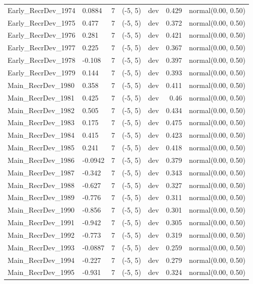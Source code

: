 \documentclass[
]{scrartcl}
\begin{document}
\begin{longtable}{llrllrl}
Early\_RecrDev\_1974 & 0.0884 & 7 & (-5, 5) & dev & 0.429 & normal(0.00, 0.50) \\ 
Early\_RecrDev\_1975 & 0.477 & 7 & (-5, 5) & dev & 0.372 & normal(0.00, 0.50) \\ 
Early\_RecrDev\_1976 & 0.281 & 7 & (-5, 5) & dev & 0.421 & normal(0.00, 0.50) \\ 
Early\_RecrDev\_1977 & 0.225 & 7 & (-5, 5) & dev & 0.367 & normal(0.00, 0.50) \\ 
Early\_RecrDev\_1978 & -0.108 & 7 & (-5, 5) & dev & 0.397 & normal(0.00, 0.50) \\ 
Early\_RecrDev\_1979 & 0.144 & 7 & (-5, 5) & dev & 0.393 & normal(0.00, 0.50) \\ 
Main\_RecrDev\_1980 & 0.358 & 7 & (-5, 5) & dev & 0.411 & normal(0.00, 0.50) \\ 
Main\_RecrDev\_1981 & 0.425 & 7 & (-5, 5) & dev & 0.46 & normal(0.00, 0.50) \\ 
Main\_RecrDev\_1982 & 0.505 & 7 & (-5, 5) & dev & 0.434 & normal(0.00, 0.50) \\ 
Main\_RecrDev\_1983 & 0.175 & 7 & (-5, 5) & dev & 0.475 & normal(0.00, 0.50) \\ 
Main\_RecrDev\_1984 & 0.415 & 7 & (-5, 5) & dev & 0.423 & normal(0.00, 0.50) \\ 
Main\_RecrDev\_1985 & 0.241 & 7 & (-5, 5) & dev & 0.418 & normal(0.00, 0.50) \\ 
Main\_RecrDev\_1986 & -0.0942 & 7 & (-5, 5) & dev & 0.379 & normal(0.00, 0.50) \\ 
Main\_RecrDev\_1987 & -0.342 & 7 & (-5, 5) & dev & 0.343 & normal(0.00, 0.50) \\ 
Main\_RecrDev\_1988 & -0.627 & 7 & (-5, 5) & dev & 0.327 & normal(0.00, 0.50) \\ 
Main\_RecrDev\_1989 & -0.776 & 7 & (-5, 5) & dev & 0.311 & normal(0.00, 0.50) \\ 
Main\_RecrDev\_1990 & -0.856 & 7 & (-5, 5) & dev & 0.301 & normal(0.00, 0.50) \\ 
Main\_RecrDev\_1991 & -0.942 & 7 & (-5, 5) & dev & 0.305 & normal(0.00, 0.50) \\ 
Main\_RecrDev\_1992 & -0.773 & 7 & (-5, 5) & dev & 0.319 & normal(0.00, 0.50) \\ 
Main\_RecrDev\_1993 & -0.0887 & 7 & (-5, 5) & dev & 0.259 & normal(0.00, 0.50) \\ 
Main\_RecrDev\_1994 & -0.227 & 7 & (-5, 5) & dev & 0.279 & normal(0.00, 0.50) \\ 
Main\_RecrDev\_1995 & -0.931 & 7 & (-5, 5) & dev & 0.324 & normal(0.00, 0.50) \\ 

\end{longtable}
\end{document}
